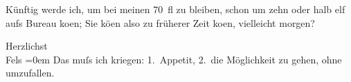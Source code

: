 \pstart
           Künftig werde ich, um bei meinen 70 fl zu bleiben, schon um zehn oder halb elf aufs
               Bureau ko{\geminationm}en; Sie kö{\geminationn}en
               also zu früherer Zeit ko{\geminationm}en, vielleicht morgen?\pend
           
\pstart
           Herzlichst{\\[\baselineskip]}\spacefill\mbox{Fels}\pend
           \leftskip=0em{}
\pstart
           \noindent{}Das muſs ich kriegen: 1. Appetit, 2. die Möglichkeit zu gehen, ohne
                  umzufallen.\pend
           \endnumbering{}  
      